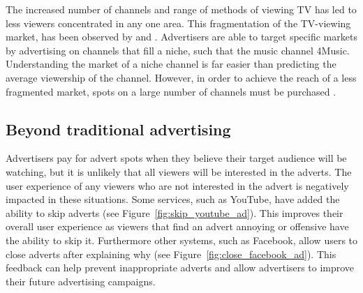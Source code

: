
	The increased number of channels and range of methods of viewing TV has led to less viewers concentrated in any one area. This fragmentation of the TV-viewing market, has been observed by \citet{audienceFragmentation} and \citet{informationOverload}. Advertisers are able to target specific markets by advertising on channels that fill a niche, such that the music channel 4Music. Understanding the market of a niche channel is far easier than predicting the average viewership of the channel. However, in order to achieve the reach of a less fragmented market, spots on a large number of channels must be purchased \citep{addressableAdvertisingOnDigitalTV}.



	
\subsection{Beyond traditional advertising}
	Advertisers pay for advert spots when they believe their target audience will be watching, but it is unlikely that all viewers will be interested in the adverts. The user experience of any viewers who are not interested in the advert is negatively impacted in these situations. Some services, such as YouTube, have added the ability to skip adverts (see Figure~\ref{fig:skip_youtube_ad}). This improves their overall user experience as viewers that find an advert annoying or offensive have the ability to skip it. Furthermore other systems, such as Facebook, allow users to close adverts after explaining why (see Figure~\ref{fig:close_facebook_ad}). This feedback can help prevent inappropriate adverts and allow advertisers to improve their future advertising campaigns. 

